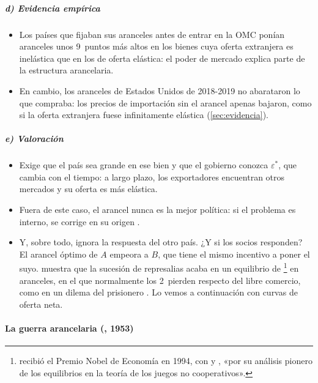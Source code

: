 \documentclass[11pt]{article}
\begin{document}
\subparagraph{d) Evidencia empírica}

\begin{itemize}
\item Los países que fijaban sus aranceles antes de entrar en la OMC ponían aranceles unos 9~puntos más altos en los bienes cuya oferta extranjera es inelástica que en los de oferta elástica: el poder de mercado explica parte de la estructura arancelaria\nocite{BrodaLimaoWeinstein2008Optimal}.
\item En cambio, los aranceles de Estados Unidos de 2018-2019 no abarataron lo que compraba: los precios de importación sin el arancel apenas bajaron, como si la oferta extranjera fuese infinitamente elástica (\ref{sec:evidencia}).
\end{itemize}

\subparagraph{e) Valoración}

\begin{itemize}
\item Exige que el país sea grande en ese bien y que el gobierno conozca $\varepsilon^*$, que cambia con el tiempo: a largo plazo, los exportadores encuentran otros mercados y su oferta es más elástica.
\item Fuera de este caso, el arancel nunca es la mejor política: si el problema es interno, se corrige en su origen .
\item Y, sobre todo, ignora la respuesta del otro país. ¿Y si los socios responden? El arancel óptimo de $A$ empeora a $B$, que tiene el mismo incentivo a poner el suyo. \textcite{Johnson1953Optimum} muestra que la sucesión de represalias acaba en un equilibrio de \footnote{ recibió el Premio Nobel de Economía en 1994, con  y , «por su análisis pionero de los equilibrios en la teoría de los juegos no cooperativos»\nocite{Nobel1994Nash}.} en aranceles, en el que normalmente los 2~pierden respecto del libre comercio, como en un dilema del prisionero  . Lo vemos a continuación con curvas de oferta neta.
\end{itemize}

\paragraph{La guerra arancelaria (, 1953)}\label{sec:johnson}
\end{document}
